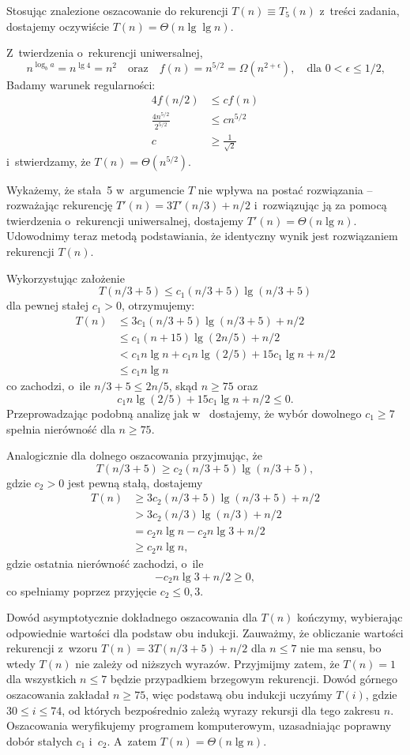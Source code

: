 Stosując znalezione oszacowanie do rekurencji $T(n)\equiv T_5(n)$ z~treści zadania, dostajemy oczywiście $T(n)=\Theta(n\lg\lg n)$.

\subproblem %
Z~twierdzenia o~rekurencji uniwersalnej,
\[
	n^{\log_ba} = n^{\lg4} = n^2 \quad\text{oraz}\quad f(n) = n^{5/2} = \Omega(n^{2+\epsilon}), \quad\text{dla $0<\epsilon\le1/2$,}
\]
Badamy warunek regularności:
\begin{align*}
	4f(n/2) &\le cf(n) \\
	\frac{4n^{5/2}}{2^{5/2}} &\le cn^{5/2} \\
	c &\ge \frac{1}{\sqrt{2}}
\end{align*}
i~stwierdzamy, że $T(n)=\Theta(n^{5/2})$.

\subproblem %
Wykażemy, że stała~5 w~argumencie $T$ nie wpływa na postać rozwiązania -- rozważając rekurencję $T'(n)=3T'(n/3)+n/2$ i~rozwiązując ją za pomocą twierdzenia o~rekurencji uniwersalnej, dostajemy $T'(n)=\Theta(n\lg n)$. Udowodnimy teraz metodą podstawiania, że identyczny wynik jest rozwiązaniem rekurencji $T(n)$.

Wykorzystując założenie
\[
	T(n/3+5) \le c_1(n/3+5)\lg(n/3+5)
\]
dla pewnej stałej $c_1>0$, otrzymujemy:
\begin{align*}
	T(n) &\le 3c_1(n/3+5)\lg(n/3+5)+n/2 \\
	&\le c_1(n+15)\lg(2n/5)+n/2 \\
	&< c_1n\lg n+c_1n\lg(2/5)+15c_1\!\lg n+n/2 \\
	&\le c_1n\lg n
\end{align*}
co zachodzi, o~ile $n/3+5\le2n/5$, skąd $n\ge75$ oraz
\[
	c_1n\lg(2/5)+15c_1\!\lg n+n/2 \le 0.
\]
Przeprowadzając podobną analizę jak w~ dostajemy, że wybór dowolnego $c_1\ge7$ spełnia nierówność dla $n\ge75$.

Analogicznie dla dolnego oszacowania przyjmując, że
\[
	T(n/3+5) \ge c_2(n/3+5)\lg(n/3+5),
\]
gdzie $c_2>0$ jest pewną stałą, dostajemy
\begin{align*}
	T(n) &\ge 3c_2(n/3+5)\lg(n/3+5)+n/2 \\
	&> 3c_2(n/3)\lg(n/3)+n/2 \\
	&= c_2n\lg n-c_2n\lg3+n/2 \\
	&\ge c_2n\lg n,
\end{align*}
gdzie ostatnia nierówność zachodzi, o~ile
\[
	-c_2n\lg3+n/2 \ge 0,
\]
co spełniamy poprzez przyjęcie $c_2\le0{,}3$.

Dowód asymptotycznie dokładnego oszacowania dla $T(n)$ kończymy, wybierając odpowiednie wartości dla podstaw obu indukcji. Zauważmy, że obliczanie wartości rekurencji z~wzoru $T(n)=3T(n/3+5)+n/2$ dla $n\le7$ nie ma sensu, bo wtedy $T(n)$ nie zależy od niższych wyrazów. Przyjmijmy zatem, że $T(n)=1$ dla wszystkich $n\le7$ będzie przypadkiem brzegowym rekurencji. Dowód górnego oszacowania zakładał $n\ge75$, więc podstawą obu indukcji uczyńmy $T(i)$, gdzie $30\le i\le 74$, od których bezpośrednio zależą wyrazy rekursji dla tego zakresu $n$. Oszacowania weryfikujemy programem komputerowym, uzasadniając poprawny dobór stałych $c_1$ i~$c_2$. A~zatem $T(n)=\Theta(n\lg n)$.

